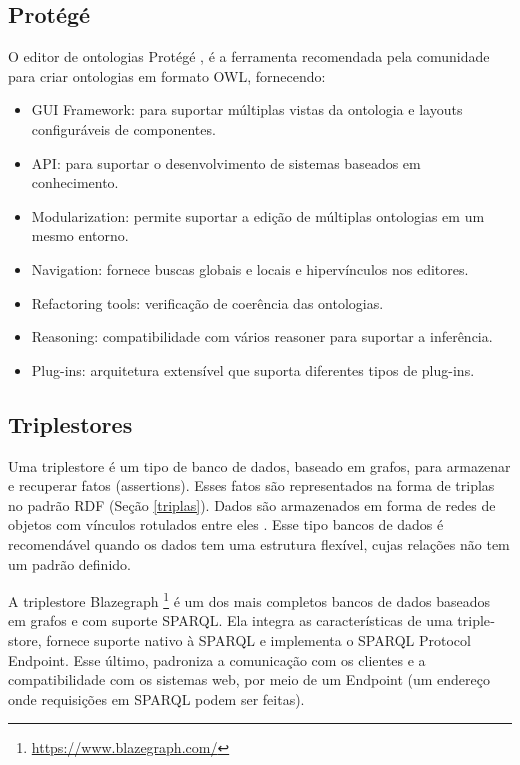 \subsection*{Protégé}

O editor de ontologias Protégé \citep{musen2015protege}, é a ferramenta
recomendada pela comunidade para criar ontologias em formato \foreignlanguage{english}{OWL},
fornecendo:
%
\begin{itemize}
\item GUI Framework:\foreignlanguage{brazil}{ para suportar múltiplas vistas
da ontologia e layouts configuráveis de componentes.}
\item API:\foreignlanguage{brazil}{ para suportar o desenvolvimento de sistemas
baseados em conhecimento.}
\item Modularization\foreignlanguage{brazil}{: permite suportar a edição
de múltiplas ontologias em um mesmo entorno.}
\item Navigation\foreignlanguage{brazil}{: fornece buscas globais e locais
e hipervínculos nos editores.}
\item Refactoring tools\foreignlanguage{brazil}{: verificação de coerência
das ontologias.}
\item Reasoning:\foreignlanguage{brazil}{ compatibilidade com vários }reasoner\foreignlanguage{brazil}{
para suportar a inferência.}
\item Plug-ins\foreignlanguage{brazil}{: arquitetura extensível que suporta
diferentes tipos de }plug-ins.
\end{itemize}
%

%

\subsection*{Triplestores \label{subsec:Triplestore}}

%
Uma \foreignlanguage{english}{triplestore} é um tipo de banco de dados,
baseado em grafos, para armazenar e recuperar fatos (assertions).
Esses fatos são representados na forma de triplas no padrão \foreignlanguage{english}{RDF}
(Seção \ref{triplas}). Dados são armazenados em forma de redes de
objetos com vínculos rotulados entre eles \citep{rusher2003triple}.
Esse tipo bancos de dados é recomendável quando os dados tem uma estrutura
flexível, cujas relações não tem um padrão definido.

A \foreignlanguage{english}{triplestore} \foreignlanguage{english}{Blazegraph}
\footnote{\url{https://www.blazegraph.com/}} é um dos mais completos
bancos de dados baseados em grafos e com suporte SPARQL. Ela integra
as características de uma \foreignlanguage{english}{triplestore},
fornece suporte nativo à \foreignlanguage{english}{SPARQL} e implementa
o \foreignlanguage{english}{SPARQL Protocol Endpoint}. Esse último,
padroniza a comunicação com os clientes e a compatibilidade com os
sistemas web, por meio de \foreignlanguage{english}{um Endpoint} (um
endereço onde requisições em SPARQL podem ser feitas). 

